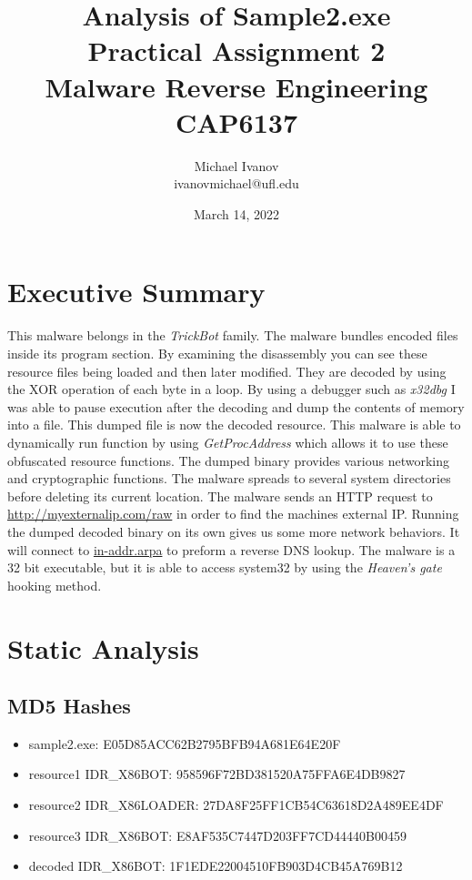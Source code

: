 \documentclass{article}
\title{Analysis of Sample2.exe \\Practical Assignment 2\\Malware Reverse Engineering \\
CAP6137}
\author{Michael Ivanov \\
ivanovmichael@ufl.edu}
\date{March 14, 2022}
\begin{document}
    \maketitle
    \pagebreak
    \section{Executive Summary}
    This malware belongs in the \textit{TrickBot} family. The malware bundles encoded files inside its program section. By examining the disassembly you can see these resource files being loaded and then later modified. They are decoded by using the XOR operation of each byte in a loop. By using a debugger such as \textit{x32dbg} I was able to pause execution after the decoding and dump the contents of memory into a file. This dumped file is now the decoded resource. This malware is able to dynamically run function by using \textit{GetProcAddress} which allows it to use these obfuscated resource functions. The dumped binary provides various networking and cryptographic functions. The malware spreads to several system directories before deleting its current location. The malware sends an HTTP request to \url{http://myexternalip.com/raw} in order to find the machines external IP. Running the dumped decoded binary on its own gives us some more network behaviors. It will connect to \url{in-addr.arpa} to preform a reverse DNS lookup. The malware is a 32 bit executable, but it is able to  access system32 by using the \textit{Heaven's gate} hooking method.
    \pagebreak
    \section{Static Analysis}
    \subsection{MD5 Hashes}
    \begin{itemize}
        \item sample2.exe: E05D85ACC62B2795BFB94A681E64E20F
        \item resource1 IDR{\_}X86BOT: 958596F72BD381520A75FFA6E4DB9827
        \item resource2 IDR{\_}X86LOADER: 27DA8F25FF1CB54C63618D2A489EE4DF
        \item resource3 IDR{\_}X86BOT: E8AF535C7447D203FF7CD44440B00459
        \item decoded IDR{\_}X86BOT: 1F1EDE22004510FB903D4CB45A769B12
    \end{itemize}
\end{document}
